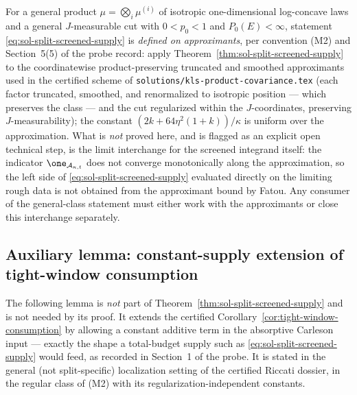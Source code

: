 \documentclass[../main.tex]{subfiles}
\begin{document}
\begin{remark}
\label{rem:sol-general-class}
For a general product $\mu=\bigotimes_i\mu^{(i)}$ of isotropic one-dimensional log-concave
laws and a general $J$-measurable cut with $0<p_0<1$ and $P_0(E)<\infty$, statement
\eqref{eq:sol-split-screened-supply} is \emph{defined on approximants}, per convention (M2)
and Section~5(5) of the probe record: apply Theorem~\ref{thm:sol-split-screened-supply} to
the coordinatewise product-preserving truncated and smoothed approximants used in the
certified scheme of \texttt{solutions/kls-product-covariance.tex} (each factor truncated,
smoothed, and renormalized to isotropic position — which preserves the class — and the cut
regularized within the $J$-coordinates, preserving $J$-measurability); the constant
$(2k+64\eta^2(1+k))/\kappa$ is uniform over the approximation.  What is \emph{not} proved
here, and is flagged as an explicit open technical step, is the limit interchange for the
screened integrand itself: the indicator $\one_{\mathcal A_{\kappa,t}}$ does not converge
monotonically along the approximation, so the left side of
\eqref{eq:sol-split-screened-supply} evaluated directly on the limiting rough data is not
obtained from the approximant bound by Fatou.  Any consumer of the general-class statement
must either work with the approximants or close this interchange separately.
\end{remark}

\subsection*{Auxiliary lemma: constant-supply extension of tight-window consumption}

The following lemma is \emph{not} part of Theorem~\ref{thm:sol-split-screened-supply} and is
not needed by its proof.  It extends the certified
Corollary~\ref{cor:tight-window-consumption} by allowing a constant additive term in the
absorptive Carleson input — exactly the shape a total-budget supply such as
\eqref{eq:sol-split-screened-supply} would feed, as recorded in Section~1 of the probe.  It
is stated in the general (not split-specific) localization setting of the certified Riccati
dossier, in the regular class of (M2) with its regularization-independent constants.
\end{document}
